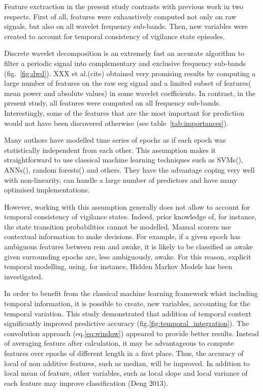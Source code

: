 Feature exctraction in the present study contrasts with previous work in two respects.
First of all, features were exhaustively computed not only on raw signals,
but also on all wavelet frequency sub-bands.
Then, new variables were created to account for temporal consistency of vigilance state episodes.

Discrete wavelet decomposition is an extremely fast an accurate algorithm to filter a periodic
signal into complementary and exclusive frequency sub-bands (fig.~\ref{fig:dwd}).
XXX et al.(cite) \citationneeded{} obtained very promising results by computing a large number of features on the raw \gls{eeg} signal
and a limited subset of features(\ie{} mean power and absolute values) in some wavelet coefficients.
In contrast, in the present study, all features were computed on all frequency sub-bands.
Interestingly, some of the features that are the most important for prediction would not have
been discovered otherwise (see table~\ref{tab:importances}).

Many authors have modelled time series of epochs as if each epoch was statistically independent from each other.
This assumption makes it straightforward to use classical machine learning techniques such as
SVMs(\citationneeded{}), ANNs(\citationneeded{}), random forests(\citationneeded{}) and others.
They have the advantage coping very well with non-linearity, can handle a large number of predictors and have many optimised implementations.

However, working with this assumption generally does not allow to account for temporal consistency of vigilance states.
Indeed, prior knowledge of, for instance, the state transition probabilities cannot be modelled.
Manual scorers use contextual information to make decisions.
For example, if a given epoch has ambiguous features between \gls{rem} and awake,
it is likely to be classified as awake given surrounding epochs are, less ambiguously, awake.
For this reason, explicit temporal modelling, using, for instance, Hidden Markov Models has been investigated\citationneeded{}.

In order to benefit from the classical machine learning
framework whist including temporal information,
it is possible to create, new variables, accounting for the temporal variation\citationneeded{}.
This study demonstrated that addition of temporal context significantly improved predictive accuracy (fig.\ref{fig:temporal_integration}).
The convolution approach (eq.\ref{eq:window}) appeared to provide better results.
Instead of averaging feature after calculation, it may be advantageous to compute features over epochs of different length in a first place.
Thus, the accuracy of local of non additive features, such as median, will be improved. In addition to local mean of feature, other variables, such as local
slope and local variance of each feature may improve classification \citationneeded(Deng 2013).

